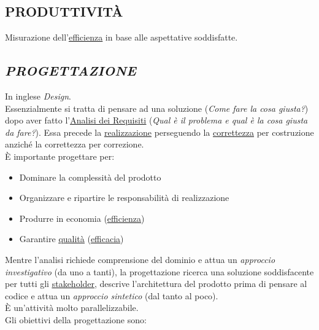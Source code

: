 		\subsection{PRODUTTIVITÀ}  \label{produttivita}
		Misurazione dell'\underline{\hyperref[efficienza]{efficienza}} in base alle aspettative soddisfatte.


		\subsection{\emph{PROGETTAZIONE}}  \label{progettazione} %
		In inglese \textit{Design}. \\
		Essenzialmente si tratta di pensare ad una soluzione (\textit{Come fare la cosa giusta?}) dopo aver fatto l'\underline{\hyperref[analisideirequisiti]{Analisi dei Requisiti}} (\textit{Qual è il problema e qual è la cosa giusta da fare?}). Essa precede la \underline{\hyperref[realizzazione]{realizzazione}} perseguendo la \underline{\hyperref[correttezza]{correttezza}} per costruzione anziché la correttezza per correzione. \\
		È importante progettare per:
		\begin{itemize}
			\item Dominare la complessità del prodotto
			\item Organizzare e ripartire le responsabilità di realizzazione
			\item Produrre in economia (\underline{\hyperref[efficienza]{efficienza}})
			\item Garantire \underline{\hyperref[qualita]{qualità}} (\underline{\hyperref[efficacia]{efficacia}})
		\end{itemize}
		Mentre l'analisi richiede comprensione del dominio e attua un \textit{approccio investigativo} (da uno a tanti), la progettazione ricerca una soluzione soddisfacente per tutti gli \underline{\hyperref[stakeholder]{stakeholder}}, descrive l'architettura del prodotto prima di pensare al codice e attua un \textit{approccio sintetico} (dal tanto al poco). \\
		È un'attività molto parallelizzabile. \\
		Gli obiettivi della progettazione sono:
